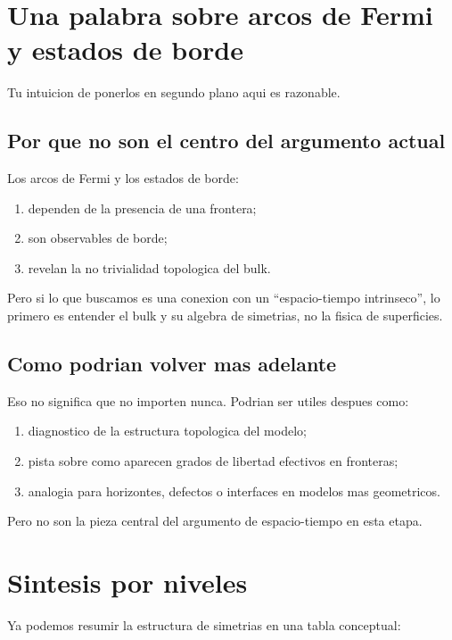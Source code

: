 \section{Una palabra sobre arcos de Fermi y estados de borde}
Tu intuicion de ponerlos en segundo plano aqui es razonable.

\subsection{Por que no son el centro del argumento actual}
Los arcos de Fermi y los estados de borde:
\begin{enumerate}[label=\arabic*.]
    \item dependen de la presencia de una frontera;
    \item son observables de borde;
    \item revelan la no trivialidad topologica del bulk.
\end{enumerate}

Pero si lo que buscamos es una conexion con un \enquote{espacio-tiempo intrinseco}, lo primero es entender el bulk y su algebra de simetrias, no la fisica de superficies.

\subsection{Como podrian volver mas adelante}
Eso no significa que no importen nunca. Podrian ser utiles despues como:
\begin{enumerate}[label=\arabic*.]
    \item diagnostico de la estructura topologica del modelo;
    \item pista sobre como aparecen grados de libertad efectivos en fronteras;
    \item analogia para horizontes, defectos o interfaces en modelos mas geometricos.
\end{enumerate}

Pero no son la pieza central del argumento de espacio-tiempo en esta etapa.

\section{Sintesis por niveles}
Ya podemos resumir la estructura de simetrias en una tabla conceptual:

